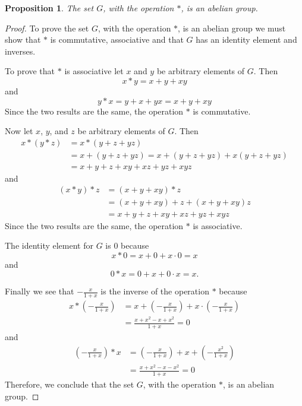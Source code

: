 \documentclass[12pt]{article}   %
\newtheorem*{proposition}{Proposition}  %
\begin{document}
\begin{proposition}
The set $G$, with the operation $\ast$, is an abelian group.
\end{proposition}
\begin{proof}
To prove the set $G$, with the operation $\ast$, is an abelian group we must show that $\ast$ is commutative, associative and that $G$ has an identity element and inverses.

To prove that $*$ is associative let $x$ and $y$ be arbitrary elements of $G$. Then
\begin{equation*}
x * y = x + y + xy
\end{equation*}
and
\begin{equation*}
y * x = y + x + yx = x + y + xy
\end{equation*}
Since the two results are the same, the operation $\ast$ is commutative.

Now let $x$, $y$, and $z$ be arbitrary elements of $G$. Then
\begin{align*}
x * (y * z) &= x * (y + z + yz) \\
&= x + (y + z + yz) = x + (y + z + yz) + x(y + z +yz) \\
&= x + y + z + xy + xz + yz + xyz
\end{align*}
and
\begin{align*}
(x * y) * z &= (x + y + xy) * z \\
&= (x + y + xy) + z + (x + y + xy)z \\
&= x + y + z + xy + xz + yz + xyz
\end{align*}
Since the two results are the same, the operation $*$ is associative.

The identity element for $G$ is $0$ because
\begin{equation*}
x * 0 = x + 0 + x \cdot 0 = x
\end{equation*}
and
\begin{equation*}
0 * x = 0 + x + 0 \cdot x = x.
\end{equation*}

Finally we see that $-\frac{x}{1+x}$ is the inverse of the operation $\ast$ because
\begin{align*}
x * \left( -\frac{x}{1+x} \right) &= x + \left( - \frac{x}{1+x} \right) + x \cdot  \left( - \frac{x}{1+x} \right) \\
&= \frac{x + x^2 - x + x^2}{1 + x} = 0
\end{align*}
and
\begin{align*}
\left( -\frac{x}{1+x} \right) * x &= \left( -\frac{x}{1+x} \right) + x + \left( -\frac{x^2}{1+x} \right) \\
&= \frac{x + x^2 - x - x^2}{1 + x} = 0
\end{align*}
Therefore, we conclude that the set $G$, with the operation $\ast$, is an abelian group.

\end{proof}
\end{document}
